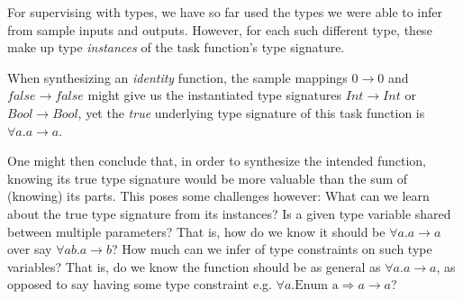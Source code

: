 \documentclass{article}
\begin{document}


    For supervising with types, we have so far used the types we were able to infer from sample inputs and outputs.
    However, for each such different type,
    these make up type \emph{instances} of the task function's type signature.

    When synthesizing an \emph{identity} function,
    the sample mappings $0 \rightarrow 0$ and $false \rightarrow false$
    might give us the instantiated type signatures
    $Int \rightarrow Int$ or $Bool \rightarrow Bool$,
    yet the \emph{true} underlying type signature of this task function is $\forall a . a \rightarrow a$.

    One might then conclude that, in order to synthesize the intended function,
    knowing its true type signature would be more valuable than the sum of (knowing) its parts.
    This poses some challenges however:
        What can we learn about the true type signature from its instances?
        Is a given type variable shared between multiple parameters?
        That is, how do we know it should be $\forall a . a \rightarrow a$ over say $\forall a b . a \rightarrow b$?
        How much can we infer of type constraints on such type variables?
        That is, do we know the function should be as general as $\forall a . a \rightarrow a$, as opposed to say having some type constraint e.g. $\forall a . \text{Enum a} \Rightarrow a \rightarrow a$?
\end{document}
